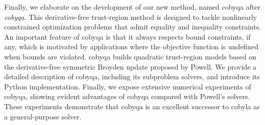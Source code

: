 Finally, we elaborate on the development of our new  method, named \gls{cobyqa} after \textit{\glsdesc{cobyqa}}.
This derivative-free trust-region  method is designed to tackle nonlinearly constrained optimization problems that admit equality and inequality constraints.
An important feature of \gls{cobyqa} is that it always respects bound constraints, if any, which is motivated by applications where the objective function is undefined when bounds are violated.
\Gls{cobyqa} builds quadratic trust-region models based on the derivative-free symmetric Broyden update proposed by Powell.
We provide a detailed description of \gls{cobyqa}, including its subproblem solvers, and introduce its Python implementation.
Finally, we expose extensive numerical experiments of \gls{cobyqa}, showing evident advantages of \gls{cobyqa} compared with Powell's  solvers.
These experiments demonstrate that \gls{cobyqa} is an excellent successor to \gls{cobyla} as a general-purpose  solver.
